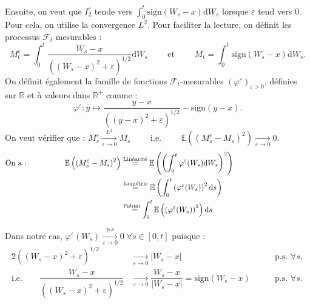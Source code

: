 \documentclass[openany]{book}
\makeatletter
\newcommand{\F}{\mathscr{F}}
\newcommand{\R}{\mathbb{R}}
\newcommand{\E}{\mathbb{E}}
\newcommand{\1}{\mathbbm{1}}
\newcommand{\sign}{\text{sign}}
\renewcommand{\d}{\mathrm{d}}
\renewenvironment{proof}[1][\textbf{\textit{Démonstration}}]{%
  \par\pushQED{\qed}%
  \normalfont\topsep6\p@\@plus6\p@\relax
  \trivlist\item[\hskip\labelsep
    #1\@addpunct{.}]\ignorespaces
}{%
  \popQED\endtrivlist\@endpefalse
}
\theoremstyle{thmfont}
\theoremstyle{deffont}
\theoremstyle{thmfont}
\theoremstyle{deffont}
\makeatother
\begin{document}
\begin{proof}
  
  \noindent Ensuite, on veut que \hyperlink{termI1}{$I_2^\varepsilon$} tende vers $\int_0^t \sign(W_s-x)\d W_s$ lorsque $\varepsilon$ tend vers $0$. Pour cela, on utilise la convergence $L^2$. Pour faciliter la lecture, on définit les processus $\F_t$ mesurables :
  $$M^\varepsilon_t = \int_0^t \dfrac{W_s-x}{((W_s-x)^2 +\varepsilon)^{1/2}}\d W_s \qquad\text{ et }\qquad M_t =  \int_0^t \sign(W_s -x)\d W_s.$$%
  On définit également la famille de fonctions $\F_t$-mesurables $(\varphi^\varepsilon)_{\varepsilon>0}$, définies sur $\R$ et à valeurs dans $\R^+$ comme :
  $$\varphi^\varepsilon : y \mapsto\dfrac{y-x}{((y-x)^2 +\varepsilon)^{1/2}} - \sign(y -x).$$
%
  $$\text{On veut vérifier que : }M^\varepsilon_s \xrightarrow[\varepsilon \to 0]{L^2} M_s \qquad \text{ i.e. } \qquad \E\left(\left(M^\varepsilon_s - M_s\right)^2\right) \xrightarrow[\varepsilon \to 0]{} 0.\qquad\qquad\qquad\qquad\qquad\qquad$$
\begin{align}
  \text{On a :}\qquad\qquad\quad
  \E\left(\left(M^\varepsilon_s - M_s\right)^2\right) &\overset{\text{Linéarité}}{=} \E \left( \left(\int_0^t\varphi^\varepsilon(W_s)\d W_s\right)^2 \right)\qquad\qquad\qquad\qquad\qquad\notag\\
  &\overset{\text{Isométrie}}{=} \E\left( \int_0^t\left( \varphi^\varepsilon(W_s) \right)^2 \d s\right)\label{arg:cvL2}\\
  &\overset{\text{Fubini}}{\;\;\;=}\int_0^t\E\left( \left(\varphi^\varepsilon(W_s)\right)^2 \right)\d s\notag
\end{align}


\noindent Dans notre cas, $\varphi^\varepsilon(W_s) \xrightarrow[\varepsilon \to 0]{\text{p.s}} 0\;\forall s \in [0,t]$ puisque :
\begin{alignat*}{2}
((W_s-x)^2 +\varepsilon)^{1/2} &\xrightarrow[\varepsilon\to 0]{} |W_s - x| \;\quad&&\text{p.s. } \forall s,\\
\text{i.e.}\qquad \dfrac{W_s-x}{((W_s-x)^2 +\varepsilon)^{1/2}} &\xrightarrow[\varepsilon \to 0]{} \dfrac{W_s-x}{|W_s - x|} = \sign(W_s -x)\quad\;&&\text{p.s. } \forall s.
\end{alignat*}



\end{proof}
\end{document}
